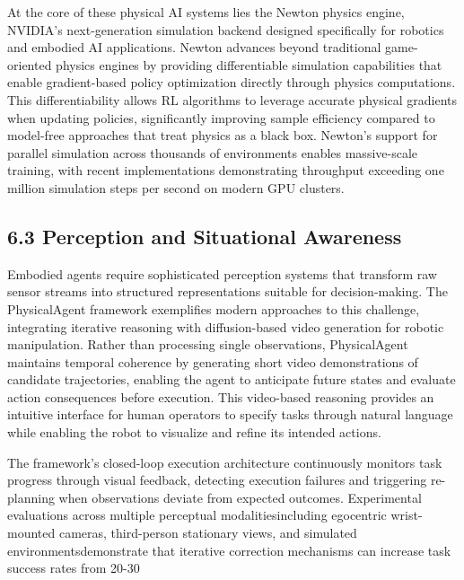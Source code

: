 At the core of these physical AI systems lies the Newton physics engine, NVIDIA's next-generation simulation backend designed specifically for robotics and embodied AI applications. Newton advances beyond traditional game-oriented physics engines by providing differentiable simulation capabilities that enable gradient-based policy optimization directly through physics computations. This differentiability allows RL algorithms to leverage accurate physical gradients when updating policies, significantly improving sample efficiency compared to model-free approaches that treat physics as a black box. Newton's support for parallel simulation across thousands of environments enables massive-scale training, with recent implementations demonstrating throughput exceeding one million simulation steps per second on modern GPU clusters.

\subsection{6.3 Perception and Situational Awareness}

Embodied agents require sophisticated perception systems that transform raw sensor streams into structured representations suitable for decision-making. The PhysicalAgent framework exemplifies modern approaches to this challenge, integrating iterative reasoning with diffusion-based video generation for robotic manipulation. Rather than processing single observations, PhysicalAgent maintains temporal coherence by generating short video demonstrations of candidate trajectories, enabling the agent to anticipate future states and evaluate action consequences before execution. This video-based reasoning provides an intuitive interface for human operators to specify tasks through natural language while enabling the robot to visualize and refine its intended actions.

The framework's closed-loop execution architecture continuously monitors task progress through visual feedback, detecting execution failures and triggering re-planning when observations deviate from expected outcomes. Experimental evaluations across multiple perceptual modalitiesincluding egocentric wrist-mounted cameras, third-person stationary views, and simulated environmentsdemonstrate that iterative correction mechanisms can increase task success rates from 20-30%

